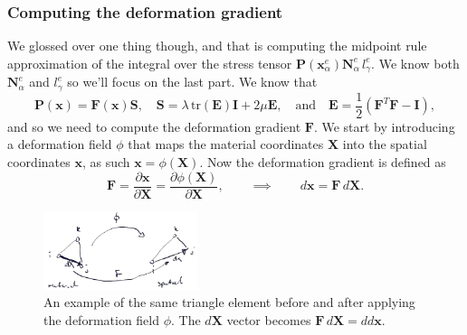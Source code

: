 \documentclass[acmtog]{acmart}
\begin{document}
\subsubsection*{Computing the deformation gradient}
We glossed over one thing though, and that is computing the midpoint rule approximation of the integral over the stress tensor $\boldsymbol P(\boldsymbol x_\alpha^e) \boldsymbol N_\alpha^e \, l_\gamma^e$. We know both $\boldsymbol N_\alpha^e$ and $l_\gamma^e$ so we'll focus on the last part. We know that
%
\begin{equation}
  \boldsymbol P(\boldsymbol x) = \boldsymbol F(\boldsymbol x) \boldsymbol S, \quad \boldsymbol S = \lambda \,\mathrm{tr}(\boldsymbol E) \boldsymbol I + 2 \mu \boldsymbol E, \quad \mathrm{and} \quad \boldsymbol E = \frac{1}{2} (\boldsymbol F^T \boldsymbol F - \boldsymbol I),
\end{equation}
%
and so we need to compute the deformation gradient $\boldsymbol F$. We start by introducing a deformation field $\phi$ that maps the material coordinates $\boldsymbol X$ into the spatial coordinates $\boldsymbol x$, as such $\boldsymbol x = \phi(\boldsymbol X)$. Now the deformation gradient is defined as
%
\begin{equation}
  \boldsymbol F = \frac{ \partial \boldsymbol x }{ \partial \boldsymbol X } = \frac{ \partial \phi(\boldsymbol X) }{ \partial \boldsymbol X }, \qquad \implies \qquad d\boldsymbol x = \boldsymbol F \, d\boldsymbol X.
\end{equation}
%

\begin{figure}
  \centering
  \includegraphics[width=0.4\textwidth]{Images/deform_field.png}
  \caption{An example of the same triangle element before and after applying the deformation field $\phi$. The $d \boldsymbol X$ vector becomes $\boldsymbol F \, d\boldsymbol X = d d\boldsymbol x $.\label{fig:deform_field}}
\end{figure}
\end{document}
